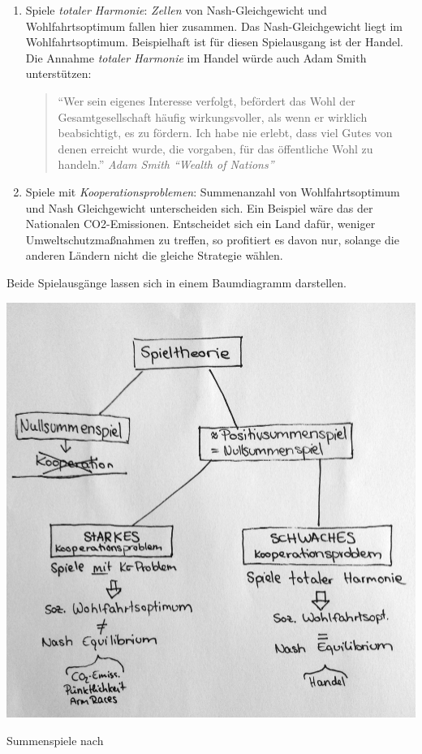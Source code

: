 \begin{enumerate}
	\item Spiele \emph{totaler Harmonie}: \emph{Zellen} von Nash-Gleichgewicht und Wohlfahrtsoptimum fallen hier zusammen. Das Nash-Gleichgewicht liegt im Wohlfahrtsoptimum.
	Beispielhaft ist für diesen Spielausgang ist der Handel.
	Die Annahme \emph{totaler Harmonie} im Handel würde auch Adam Smith unterstützen:

	\begin{quote}
		``Wer sein eigenes Interesse verfolgt, befördert das Wohl der Gesamtgesellschaft häufig wirkungsvoller, als wenn er wirklich beabsichtigt, es zu fördern. Ich habe nie erlebt, dass viel Gutes von denen erreicht wurde, die vorgaben, für das öffentliche Wohl zu handeln.'' \emph{Adam Smith ``Wealth of Nations''}
	\end{quote}
	\item Spiele mit \emph{Kooperationsproblemen}: Summenanzahl von Wohlfahrtsoptimum und Nash Gleichgewicht unterscheiden sich.
	Ein Beispiel wäre das der Nationalen CO2-Emissionen. Entscheidet sich ein Land dafür, weniger Umweltschutzmaßnahmen zu treffen, so profitiert es davon nur, solange die anderen Ländern nicht die gleiche Strategie wählen.

\end{enumerate}

Beide Spielausgänge lassen sich in einem Baumdiagramm darstellen.

\begin{dsafigure}
	\begin{center}
	\includegraphics[width=0.9\columnwidth]{img/summenspiele.jpg}
	\caption{Summenspiele nach \cite{Kleinberg-2009-oz}}
	\label{fig:gefangenendilemma}
	\end{center}
\end{dsafigure}


